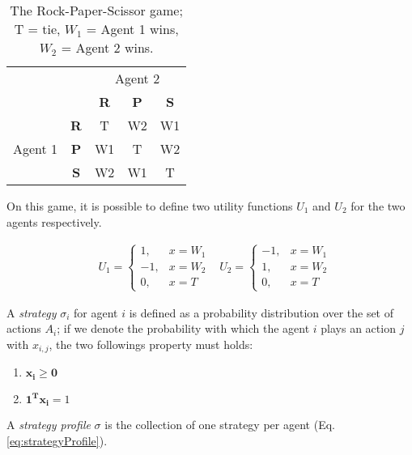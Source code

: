 \begin{Topic}[Introduction]
\begin{table}[h]
\centering
\begin{tabular}{ccccc}
 &  & \multicolumn{3}{c}{Agent 2} \\ \cline{3-5} 
 & \multicolumn{1}{c|}{} & \multicolumn{1}{c|}{\textbf{R}} & \multicolumn{1}{c|}{\textbf{P}} & \multicolumn{1}{c|}{\textbf{S}} \\ \cline{2-5} 
\multicolumn{1}{c|}{} & \multicolumn{1}{c|}{\textbf{R}} & \multicolumn{1}{c|}{T} & \multicolumn{1}{c|}{W2} & \multicolumn{1}{c|}{W1} \\ \cline{2-5} 
\multicolumn{1}{c|}{Agent 1} & \multicolumn{1}{c|}{\textbf{P}} & \multicolumn{1}{c|}{W1} & \multicolumn{1}{c|}{T} & \multicolumn{1}{c|}{W2} \\ \cline{2-5} 
\multicolumn{1}{c|}{} & \multicolumn{1}{c|}{\textbf{S}} & \multicolumn{1}{c|}{W2} & \multicolumn{1}{c|}{W1} & \multicolumn{1}{c|}{T} \\ \cline{2-5} 
\end{tabular}
\caption{The Rock-Paper-Scissor game; T = tie, $W_1$ = Agent 1 wins, $W_2$ = Agent 2 wins.}
\label{tab:rps}
\end{table}

On this game, it is possible to define two utility functions $U_1$ and $U_2$ for the two agents respectively.

\begin{align*} 
& U_1 =  \begin{cases} 1, & x = W_1 \\ -1, & x = W_2 \\ 0, & x = T \end{cases}
& U_2 =  \begin{cases} -1, & x = W_1 \\ 1, & x = W_2 \\ 0, & x = T \end{cases}
\end{align*} 

A \emph{strategy} $\sigma_i$ for agent $i$ is defined as a probability distribution over the set of actions $A_i$; if we denote the probability with which the agent $i$ plays an action $j$ with $x_{i,j}$, the two followings property must holds:
\begin{enumerate}
\item $\mathbf{x_i} \geq \mathbf{0}$
\item $ \mathbf{1^Tx_i} = 1$
\end{enumerate}

A \emph{strategy profile} $\sigma$ is the collection of one strategy per agent (Eq. \ref{eq:strategyProfile}).


\end{Topic}
